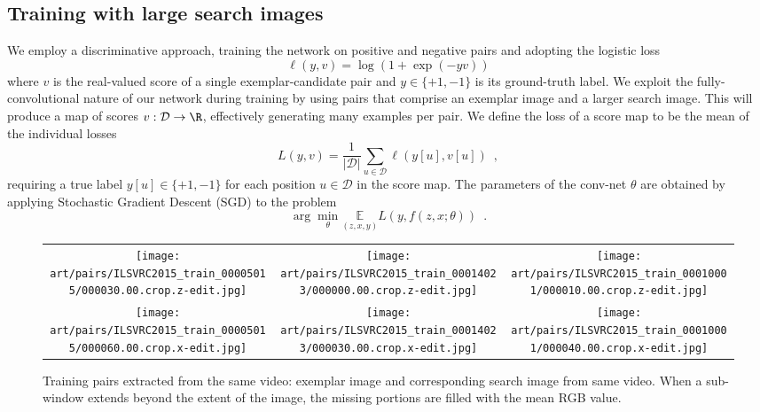 \subsection{Training with large search images\label{sec:training}}

We employ a discriminative approach, training the network on positive and negative pairs and adopting the logistic loss
\begin{equation}
\ell(y, v) = \log(1 + \exp(-y v))
\end{equation}
where $v$ is the real-valued score of a single exemplar-candidate pair and $y \in \{+1, -1\}$ is its ground-truth label.
We exploit the fully-convolutional nature of our network during training by using pairs that comprise an exemplar image and a larger search image.
This will produce a map of scores $v : \mathcal{D} \to \R$, effectively generating many examples per pair.
We define the loss of a score map to be the mean of the individual losses
\begin{equation}\label{eq:global-loss}
L(y, v) = \frac{1}{|\mathcal{D}|} \sum_{u \in \mathcal{D}} \ell(y[u], v[u]) \enspace ,
\end{equation}
requiring a true label $y[u] \in \{+1, -1\}$ for each position $u \in \mathcal{D}$ in the score map.
The parameters of the conv-net $\theta$ are obtained by applying Stochastic Gradient Descent (SGD) to the problem
\begin{equation}
\arg\min_{\theta} \underset{(z, x, y)}{\mathbb{E}} L(y, f(z, x; \theta)) \enspace .
\label{eq:training}
\end{equation}

\begin{figure}[t]
\centering


\begin{tabular}{ccc} 

\texttt{[image: art/pairs/ILSVRC2015\_train\_00005015/000030.00.crop.z-edit.jpg]}
& \texttt{[image: art/pairs/ILSVRC2015\_train\_00014023/000000.00.crop.z-edit.jpg]}
& \texttt{[image: art/pairs/ILSVRC2015\_train\_00010001/000010.00.crop.z-edit.jpg]}
\\
\texttt{[image: art/pairs/ILSVRC2015\_train\_00005015/000060.00.crop.x-edit.jpg]}
& \texttt{[image: art/pairs/ILSVRC2015\_train\_00014023/000030.00.crop.x-edit.jpg]}
& \texttt{[image: art/pairs/ILSVRC2015\_train\_00010001/000040.00.crop.x-edit.jpg]}

\end{tabular}
 \caption{
Training pairs extracted from the same video: exemplar image and corresponding search image from same video.
When a sub-window extends beyond the extent of the image, the missing portions are filled with the mean RGB value.
}
\label{fig:pos-pairs}
\end{figure}

